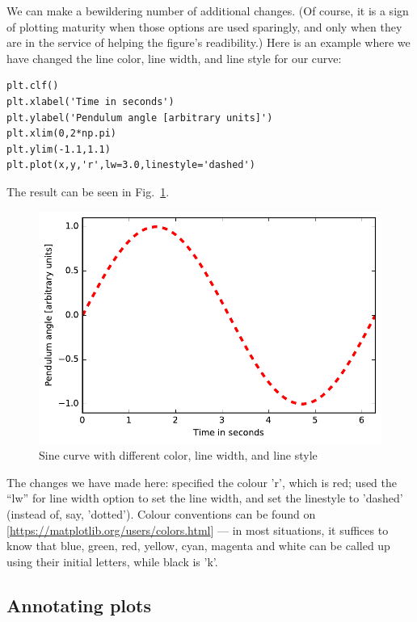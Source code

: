 \documentclass[twocolumn,apj]{openjournal}
\begin{document}
We can make a bewildering number of additional changes. (Of course, it is a sign of plotting maturity when those options are used sparingly, and only when they are in the service of helping the figure's readibility.) Here is an example where we have changed the line color, line width, and line style for our curve:\begin{lstlisting}
plt.clf()
plt.xlabel('Time in seconds')
plt.ylabel('Pendulum angle [arbitrary units]')
plt.xlim(0,2*np.pi)
plt.ylim(-1.1,1.1)
plt.plot(x,y,'r',lw=3.0,linestyle='dashed')
\end{lstlisting}
The result can be seen in Fig.~\ref{SinPlotChanged}.
\begin{figure}[htbp]
\begin{center}
\includegraphics[width=\linewidth]{sinplot-line.pdf}
\caption{Sine curve with different color, line width, and line style}
\label{SinPlotChanged}
\end{center}
\end{figure}
The changes we have made here: specified the colour 'r', which is red; used the ``lw'' for line width option to set the line width, and set the linestyle to 'dashed' (instead of, say, 'dotted'). Colour conventions can be found on 
[\href{https://matplotlib.org/users/colors.html}{https://matplotlib.org/users/colors.html}]
--- in most situations, it suffices to know that blue, green, red, yellow, cyan, magenta and white can be called up using their initial letters, while black is 'k'.

\subsection{Annotating plots}
\end{document}
